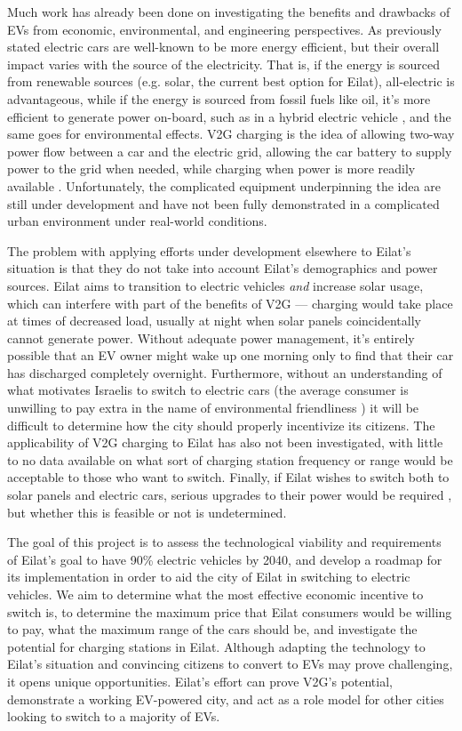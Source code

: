 \documentclass{article}                         %
\begin{document}
Much work has already been done on investigating the benefits and drawbacks of EVs from economic, environmental, and engineering perspectives. As previously stated electric cars are well-known to be more energy efficient, but their overall impact varies with the source of the electricity. That is, if the energy is sourced from renewable sources (e.g. solar, the current best option for Eilat), all-electric is advantageous, while if the energy is sourced from fossil fuels like oil, it's more efficient to generate power on-board, such as in a hybrid electric vehicle \cite{Dincer2010EconomicOptions}, and the same goes for environmental effects. V2G charging is the idea of allowing two-way power flow between a car and the electric grid, allowing the car battery to supply power to the grid when needed, while charging when power is more readily available \cite{Mahmud2015PowerEV}. Unfortunately, the complicated equipment underpinning the idea are still under development \cite{2018Nuvve...} and have not been fully demonstrated in a complicated urban environment under real-world conditions.

The problem with applying efforts under development elsewhere to Eilat's situation is that they do not take into account Eilat's demographics and power sources. Eilat aims to transition to electric vehicles \textit{and} increase solar usage, which can interfere with part of the benefits of V2G --- charging would take place at times of decreased load, usually at night when solar panels coincidentally cannot generate power. Without adequate power management, it's entirely possible that an EV owner might wake up one morning only to find that their car has discharged completely overnight. Furthermore, without an understanding of what motivates Israelis to switch to electric cars (the average consumer is unwilling to pay extra in the name of environmental friendliness \cite{Mock2010MarketVehicles}) it will be difficult to determine how the city should properly incentivize its citizens. The applicability of V2G charging to Eilat has also not been investigated, with little to no data available on what sort of charging station frequency or range would be acceptable to those who want to switch. Finally, if Eilat wishes to switch both to solar panels and electric cars, serious upgrades to their power would be required \cite{Vardimon2011AssessmentIsrael}, but whether this is feasible or not is undetermined.

The goal of this project is to assess the technological viability and requirements of Eilat's goal to have 90\% electric vehicles by 2040, and develop a roadmap for its implementation in order to aid the city of Eilat in switching to electric vehicles. We aim to determine what the most effective economic incentive to switch is, to determine the maximum price that Eilat consumers would be willing to pay, what the maximum range of the cars should be, and investigate the potential for charging stations in Eilat. Although adapting the technology to Eilat's situation and convincing citizens to convert to EVs may prove challenging, it opens unique opportunities. Eilat's effort can prove V2G's potential, demonstrate a working EV-powered city, and act as a role model for other cities looking to switch to a majority of EVs.
\end{document}
